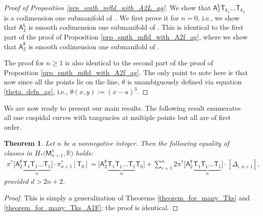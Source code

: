 \documentclass[pdftex]{sigma}
\numberwithin{equation}{section}
\newtheorem{thm}{Theorem}[section]
\begin{document}
\begin{proof}[Proof of Proposition \ref{prp_smth_mfld_with_A2L_ag}]
We show that
$\mathsf{A}^{\mathsf{L}}_2\overline{\mathsf{T}}_{k_1}\dots \overline{\mathsf{T}}_{k_n}$
is a codimension one submanifold of~.
We first prove it for $n = 0$, i.e., we show that
$\mathsf{A}^{\mathsf{L}}_2$ is smooth codimension one submanifold of
.
This is identical to the first part of the
proof of Proposition \ref{prp_smth_mfld_with_A2f_ag}, where we show that
$\mathsf{A}^{\mathsf{F}}_2$ is smooth codimension one submanifold of
.

The proof for $n\geq 1$ is also identical to the second part of the proof of
Proposition \ref{prp_smth_mfld_with_A2f_ag}. The only point to note here is that
now since all the points lie on the line, $\theta$ is unambiguously defined
via equation \eqref{theta_defn_ag}, i.e., $\theta(x, y) := (x-a)^3$.
\end{proof}

We are now ready to present our main results.
The following result enumerates all one cuspidal curves with tangencies
at multiple points but all are of
first order.

\begin{thm}
\label{theorem_for_many_Tks_A2F}
Let $n$ be a nonnegative integer.
Then the following equality of classes in $H_* \bigl(\mathsf{M}_{{n+1}}^1, \mathbb{R}\bigr)$ holds:
\begin{align*}%
\pi^{\ast}\bigl[\mathsf{A}_2^{\mathsf{F}} \underbrace{ \mathsf{T}_{1} \mathsf{T}_{1} \dots \mathsf{T}_{1}}_{n}\bigr]\cdot
\pi_{n+1}^{\ast} [\mathsf{T}_0]  =
\bigl[\mathsf{A}_2^{\mathsf{F}} \underbrace{\mathsf{T}_{1} \mathsf{T}_{1} \dots \mathsf{T}_{1}}_{n} \mathsf{T}_{0}\bigr]
 + \sum_{i=1}^{n} 2 \pi^{\ast}\bigl[\mathsf{A}_2^{\mathsf{F}}
\underbrace{\mathsf{T}_{1} \mathsf{T}_{1} \dots \mathsf{T}_{1}}_{n}\bigr] \cdot [\Delta_{i, {n+1}}],
\end{align*}
provided $d > 2n+2$.
\end{thm}

\begin{proof} This is simply a generalization of Theorems \ref{theorem_for_many_Tks} and
\ref{theorem_for_many_Tks_A1F}; the proof is identical.
\end{proof}
\end{document}
